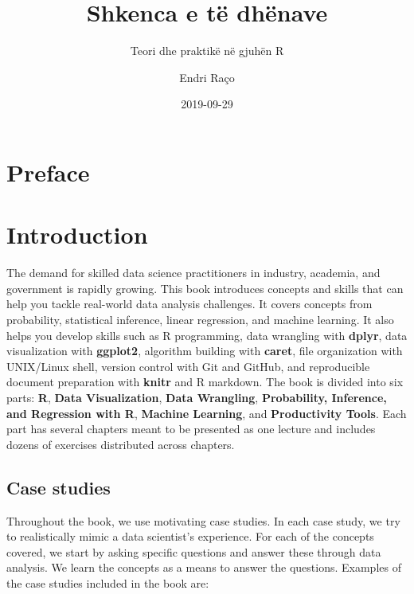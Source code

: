 \documentclass[openany]{book}
\title{Shkenca e të dhënave}
\subtitle{Teori dhe praktikë në gjuhën R}
\author{Endri Raço}
\date{2019-09-29}
\begin{document}
\maketitle

{
\setcounter{tocdepth}{2}
\tableofcontents
}
\hypertarget{preface}{%
\chapter*{Preface}\label{preface}}


\hypertarget{introduction}{%
\chapter*{Introduction}\label{introduction}}


The demand for skilled data science practitioners in industry, academia, and government is rapidly growing. This book introduces concepts and skills that can help you tackle real-world data analysis challenges. It covers concepts from probability, statistical inference, linear regression, and machine learning. It also helps you develop skills such as R programming, data wrangling with \textbf{dplyr}, data visualization with \textbf{ggplot2}, algorithm building with \textbf{caret}, file organization with UNIX/Linux shell, version control with Git and GitHub, and reproducible document preparation with \textbf{knitr} and R markdown. The book is divided into six parts: \textbf{R}, \textbf{Data Visualization}, \textbf{Data Wrangling}, \textbf{Probability, Inference, and Regression with R}, \textbf{Machine Learning}, and \textbf{Productivity Tools}. Each part has several chapters meant to be presented as one lecture and includes dozens of exercises distributed across chapters.

\hypertarget{case-studies}{%
\section*{Case studies}\label{case-studies}}


Throughout the book, we use motivating case studies. In each case study, we try to realistically mimic a data scientist's experience. For each of the concepts covered, we start by asking specific questions and answer these through data analysis. We learn the concepts as a means to answer the questions. Examples of the case studies included in the book are:
\end{document}
